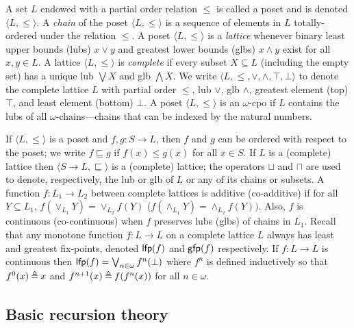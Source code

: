 \documentclass[runningheads]{llncs}
\def\ok#1{\mbox{\raisebox{0ex}[1ex][1ex]{$#1$}}}
\newcommand{\ra}{\rightarrow}
\newcommand{\ud}{\ok{\:\triangleq\:}}
\def\ok#1{\mbox{\raisebox{0ex}[1ex][1ex]{$#1$}}}
\def\lfp{{\sf lfp\/}}
\def\gfp{{\sf gfp\/}}
\newcommand{\nat}{\omega}
\def\tuple#1{\langle #1 \rangle}
\begin{document}
A set $L$ endowed with a partial order relation $\leq$ is called a poset and 
is denoted $\tuple{L,\leq}$. A \emph{chain} of the poset $\tuple{L,\leq}$ is a 
sequence of elements in $L$ totally-ordered under the relation \(\leq\).
A poset $\tuple{L,\leq}$ is a \emph{lattice} whenever binary least upper bounds (lubs)
$x \vee y$ and greatest lower bounds (glbs) $x \wedge y$ exist for all  $x,y \in L$. 
A lattice $\tuple{L,\leq}$ is \emph{complete} if every subset $X \subseteq L$ (including
the empty set) has a unique lub $\bigvee X$ and glb $\bigwedge X$. We write $\tuple{L, 
\leq, \vee, \wedge, \top, \bot}$ to denote the complete lattice $L$ with partial order
$\leq$, lub $\vee$, glb $\wedge$, greatest element (top) $\top$, and least element
(bottom) $\bot$. A poset $\tuple{L,\leq}$ is an $\omega$-cpo if $L$ contains the lubs of all $\omega$-chains---chains that can be indexed by the natural numbers.

If $\tuple{L,\leq}$ is a poset and $f,g:S \ra L$, then \(f\) and \(g\) can be
ordered with respect to the poset; we write $f \sqsubseteq g$ if
$f(x) \leq g(x)$ for all $x \in S$. If $L$ is a (complete) lattice 
then $\tuple{S\ra L,\sqsubseteq}$ is a (complete) lattice; the operators
$\sqcup$ and $\sqcap$ are used to denote, respectively, the lub or glb of \(L\)
or any of its chains or subsets. A function $f : L_1 \ra L_2$ between complete lattices is additive (co-additive) 
if for all $Y \subseteq L_1$, $f(\vee_{L_1} Y ) = \vee_{L_2} f(Y)$ ($f(\wedge_{L_1} Y ) = \wedge_{L_2} f(Y ))$. Also, $f$ is continuous (co-continuous) when $f$ preserves lubs (glbs) of chains in $L_1$. Recall that any monotone function $f:L \ra L$ on a complete lattice $L$ 
always has least and greatest fix-points, denoted $\lfp(f)$ and $\gfp(f)$
respectively. If $f:L \ra L$ is continuous then  
$\lfp(f)=\bigvee_{n\in\nat}f^n(\bot)$ where \(f^n\) is defined inductively so that 
$f^0(x)\ud x$ and $f^{n+1}(x)\ud f(f^n(x))$ for all \(n \in \nat\). 

\subsection{Basic recursion theory}\label{comp-sec}
\end{document}
